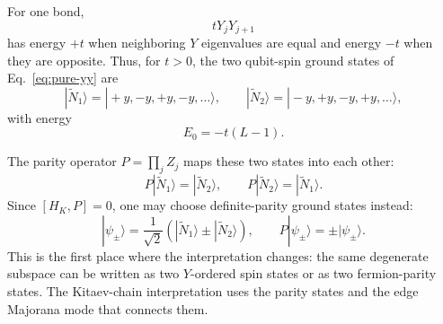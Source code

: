 \documentclass[11pt]{article}
\newcommand{\ket}[1]{|#1\rangle}
\begin{document}
For one bond,
\begin{equation}
  tY_jY_{j+1}
\end{equation}
has energy $+t$ when neighboring $Y$ eigenvalues are equal and energy $-t$
when they are opposite. Thus, for $t>0$, the two qubit-spin ground states of
Eq.~\eqref{eq:pure-yy} are
\begin{equation}
  \ket{\widetilde N_1}
  =
  \ket{+y,-y,+y,-y,\ldots},
  \qquad
  \ket{\widetilde N_2}
  =
  \ket{-y,+y,-y,+y,\ldots},
  \label{eq:y-neel}
\end{equation}
with energy
\begin{equation}
  E_0=-t(L-1).
\end{equation}

The parity operator $P=\prod_j Z_j$ maps these two states into each other:
\begin{equation}
  P\ket{\widetilde N_1}=\ket{\widetilde N_2},
  \qquad
  P\ket{\widetilde N_2}=\ket{\widetilde N_1}.
\end{equation}
Since $[H_K,P]=0$, one may choose definite-parity ground states instead:
\begin{equation}
  \ket{\psi_\pm}
  =
  \frac{1}{\sqrt{2}}
  \left(\ket{\widetilde N_1}\pm\ket{\widetilde N_2}\right),
  \qquad
  P\ket{\psi_\pm}=\pm\ket{\psi_\pm}.
\end{equation}
This is the first place where the interpretation changes: the same degenerate
subspace can be written as two $Y$-ordered spin states or as two fermion-parity
states. The Kitaev-chain interpretation uses the parity states and the edge
Majorana mode that connects them.
\end{document}
